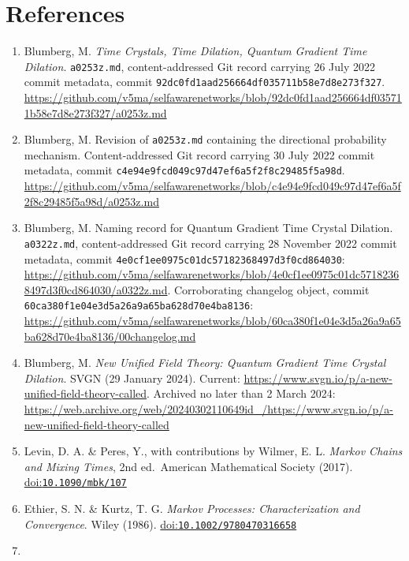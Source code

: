 \documentclass[
  american,
  11pt,
  letterpaper,
]{article}
\providecommand{\tightlist}{%
  \setlength{\itemsep}{0pt}\setlength{\parskip}{0pt}}
\begin{document}
\section{References}\label{references}

\begin{enumerate}
\def\labelenumi{\arabic{enumi}.}
\tightlist
\item
  Blumberg, M. \emph{Time Crystals, Time Dilation, Quantum Gradient Time Dilation}. \texttt{a0253z.md}, content-addressed Git record carrying 26 July 2022 commit metadata, commit \nolinkurl{92dc0fd1aad256664df035711b58e7d8e273f327}. \url{https://github.com/v5ma/selfawarenetworks/blob/92dc0fd1aad256664df035711b58e7d8e273f327/a0253z.md}
\item
  Blumberg, M. Revision of \texttt{a0253z.md} containing the directional probability mechanism. Content-addressed Git record carrying 30 July 2022 commit metadata, commit \nolinkurl{c4e94e9fcd049c97d47ef6a5f2f8c29485f5a98d}. \url{https://github.com/v5ma/selfawarenetworks/blob/c4e94e9fcd049c97d47ef6a5f2f8c29485f5a98d/a0253z.md}
\item
  Blumberg, M. Naming record for Quantum Gradient Time Crystal Dilation. \texttt{a0322z.md}, content-addressed Git record carrying 28 November 2022 commit metadata, commit \nolinkurl{4e0cf1ee0975c01dc57182368497d3f0cd864030}: \url{https://github.com/v5ma/selfawarenetworks/blob/4e0cf1ee0975c01dc57182368497d3f0cd864030/a0322z.md}. Corroborating changelog object, commit \nolinkurl{60ca380f1e04e3d5a26a9a65ba628d70e4ba8136}: \url{https://github.com/v5ma/selfawarenetworks/blob/60ca380f1e04e3d5a26a9a65ba628d70e4ba8136/00changelog.md}
\item
  Blumberg, M. \emph{New Unified Field Theory: Quantum Gradient Time Crystal Dilation}. SVGN (29 January 2024). Current: \url{https://www.svgn.io/p/a-new-unified-field-theory-called}. Archived no later than 2 March 2024: \url{https://web.archive.org/web/20240302110649id_/https://www.svgn.io/p/a-new-unified-field-theory-called}
\item
  Levin, D. A. \& Peres, Y., with contributions by Wilmer, E. L. \emph{Markov Chains and Mixing Times}, 2nd ed.~American Mathematical Society (2017). \href{https://doi.org/10.1090/mbk/107}{doi:\nolinkurl{10.1090/mbk/107}}
\item
  Ethier, S. N. \& Kurtz, T. G. \emph{Markov Processes: Characterization and Convergence}. Wiley (1986). \href{https://doi.org/10.1002/9780470316658}{doi:\nolinkurl{10.1002/9780470316658}}
\item

\end{enumerate}
\end{document}
